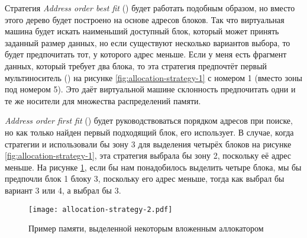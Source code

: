 Стратегия \emph{Address order best fit} () будет работать подобным образом, но вместо этого дерево будет построено на основе адресов блоков. Так что виртуальная машина будет искать наименьший доступный блок, который может принять заданный размер данных, но если существуют несколько вариантов выбора, то будет предпочитать тот, у которого адрес меньше. Если у меня есть фрагмент данных, который требует два блока, то эта стратегия предпочтёт первый мультиноситель () на рисунке \ref{fig:allocation-strategy-1} с номером 1 (вместо зоны под номером 5). Это даёт виртуальной машине склонность предпочитать одни и те же носители для множества распределений памяти.

\emph{Address order first fit} () будет руководствоваться порядком адресов при поиске, но как только найден первый подходящий блок,  его использует. В случае, когда стратегии  и  использовали бы зону 3 для выделения четырёх блоков на рисунке \ref{fig:allocation-strategy-1}, эта стратегия выбрала бы зону 2, поскольку её адрес меньше. На рисунке  \ref{fig:allocation-strategy-2}, если бы нам понадобилось выделить четыре блока, мы бы предпочли блок 1 блоку 3, поскольку его адрес меньше, тогда как  выбрал бы вариант 3 или 4, а  выбрал бы 3.

\begin{figure}
  \texttt{[image: allocation-strategy-2.pdf]}%
  \centering%
	\caption{Пример памяти, выделенной некоторым вложенным аллокатором}
   \label{fig:allocation-strategy-2}
\end{figure}
\FloatBarrier

